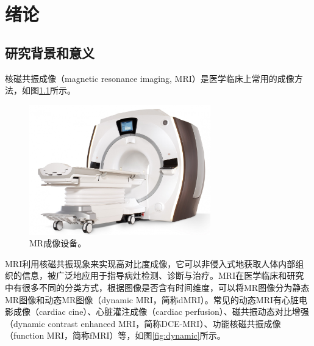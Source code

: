 \chapter{绪论}
\label{chap:introduction}

\section{研究背景和意义}
核磁共振成像\cite{mrireview}（magnetic resonance imaging, MRI）是医学临床上常用的成像方法，如图\ref{fig:mri}所示。
\begin{figure}[htbp]
\centerline{\includegraphics[width=0.7\textwidth]{img/intro/mri.jpg}}
\caption{MR成像设备。}
\label{fig:mri}
\end{figure}
MRI利用核磁共振现象来实现高对比度成像，它可以非侵入式地获取人体内部组织的信息，被广泛地应用于指导病灶检测、诊断与治疗。MRI在医学临床和研究中有很多不同的分类方式，根据图像是否含有时间维度，可以将MR图像分为静态MR图像和动态MR图像（dynamic MRI，简称dMRI）。常见的动态MRI有心脏电影成像（cardiac cine）、心脏灌注成像（cardiac perfusion）、磁共振动态对比增强（dynamic contrast enhanced MRI，简称DCE-MRI）、功能核磁共振成像（function MRI，简称fMRI）等，如图\ref{fig:dynamic}所示。
